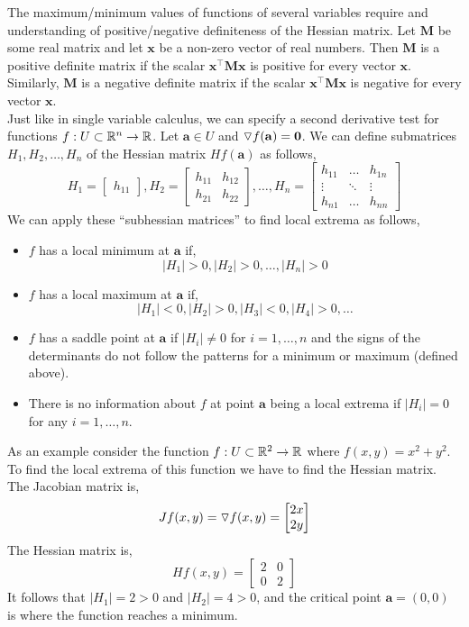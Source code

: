 \documentclass[12pt]{article}
\begin{document}
 The maximum/minimum values of functions of several variables require and understanding of positive/negative definiteness of the Hessian matrix. Let $\mathbf{M}$ be some real matrix and let $\mathbf{x}$ be a non-zero vector of real numbers. Then $\mathbf{M}$ is a positive definite matrix if the scalar $\mathbf{x}^\top\mathbf{M}\mathbf{x}$ is positive for every vector $\mathbf{x}$. Similarly, $\mathbf{M}$ is a negative definite matrix if the scalar $\mathbf{x}^\top\mathbf{M}\mathbf{x}$ is negative for every vector $\mathbf{x}$. \\

 Just like in single variable calculus, we can specify a second derivative test for functions $f:U\subset\mathbb{R}^n\rightarrow\mathbb{R}$. Let $\mathbf{a}\in U$ and $\triangledown f(\mathbf{a})=\mathbf{0}$. We can define submatrices $H_1,H_2,\ldots,H_n$ of the Hessian matrix $Hf(\mathbf{a})$ as follows,
\[
H_1 = 
\begin{bmatrix}
h_{11}
\end{bmatrix},
H_2 = 
\begin{bmatrix}
h_{11} & h_{12} \\
h_{21} & h_{22}
\end{bmatrix},
\ldots,
H_n = 
\begin{bmatrix}
h_{11} & \ldots & h_{1n} \\
\vdots & \ddots & \vdots \\
h_{n1} & \ldots & h_{nn}
\end{bmatrix}
\] 
We can apply these ``subhessian matrices'' to find local extrema as follows,
\begin{itemize}
\item $f$ has a local minimum at $\mathbf{a}$ if,
\[
|H_1| >0, |H_2| >0, \ldots, |H_n| >0
\]
\item $f$ has a local maximum at $\mathbf{a}$ if,
\[
|H_1| <0, |H_2| >0, |H_3| <0, |H_4| >0, \ldots
\]
\item $f$ has a saddle point at $\mathbf{a}$ if $|H_i|\neq0$ for $i=1,\ldots,n$ and the signs of the determinants do not follow the patterns for a minimum or maximum (defined above). 
\item There is no information about $f$ at point $\mathbf{a}$ being a local extrema if $|H_i|=0$ for any $i=1,\ldots,n$.
\end{itemize}

 As an example consider the function $f:U\subset\mathbb{R}^2\rightarrow\mathbb{R}$ where $f(x,y) = x^2 + y^2$. To find the local extrema of this function we have to find the Hessian matrix. The Jacobian matrix is,
\[
Jf(x,y) = \triangledown f(x,y) =
\begin{bmatrix}
 2x \\
 2y                                           
\end{bmatrix}
\]
 The Hessian matrix is,
\[
Hf(x,y) = 
\begin{bmatrix}
2 & 0 \\
0 & 2
\end{bmatrix}
\]
It follows that $|H_1|=2>0$ and $|H_2|=4>0$, and the critical point $\mathbf{a}=(0,0)$ is where the function reaches a minimum. \\
\end{document}
